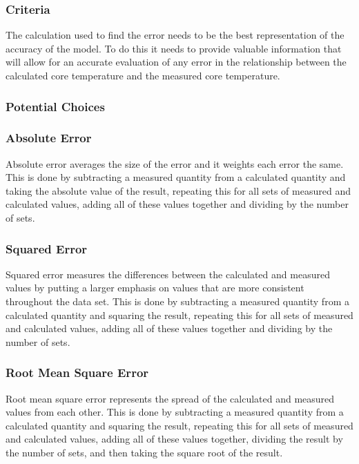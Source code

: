 		\subsubsection*{Criteria}
		
		The calculation used to find the error needs to be the best representation of the accuracy of the model. To do this it needs to provide valuable information that will allow for an accurate evaluation of any error in the relationship between the calculated core temperature and the measured core temperature. 
		
	
		\subsubsection*{Potential Choices}

		\subsubsection*{Absolute Error}
		
		Absolute error averages the size of the error and it weights each error the same. This is done by subtracting a measured quantity from a calculated quantity and taking the absolute value of the result, repeating this for all sets of measured and calculated values, adding all of these values together and dividing by the number of sets.\cite{AbsSqr}  

		\subsubsection*{Squared Error}
		
		Squared error measures the differences between the calculated and measured values by putting a larger emphasis on values that are more consistent throughout the data set. This is done by subtracting a measured quantity from a calculated quantity and squaring the result, repeating this for all sets of measured and calculated values, adding all of these values together and dividing by the number of sets.\cite{AbsSqr} 

		\subsubsection*{Root Mean Square Error}
		
		Root mean square error represents the spread of the calculated and measured values from each other. This is done by subtracting a measured quantity from a calculated quantity and squaring the result, repeating this for all sets of measured and calculated values, adding all of these values together, dividing the result by the number of sets, and then taking the square root of the result.\cite{Root}\cite{RootAbs} 

